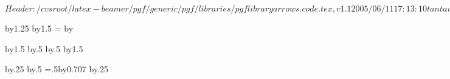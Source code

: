 \ProvidesPackageRCS $Header: /cvsroot/latex-beamer/pgf/generic/pgf/libraries/pgflibraryarrows.code.tex,v 1.1 2005/06/11 17:13:10 tantau Exp $

%



\pgfarrowsdeclare{[}{]}
{
  \@tempdima=1pt%
  \advance\@tempdima by1.25\pgflinewidth%
  \pgfarrowsleftextend{-\@tempdima}
  \pgfarrowsrightextend{.5\pgflinewidth}
}
{
  \@tempdima=2pt%
  \advance\@tempdima by1.5\pgflinewidth%
  \@tempdimb=\@tempdima%
  \advance\@tempdimb by\pgflinewidth%
  \pgfsetdash{}{0pt}
  \pgfsetmiterjoin
  \pgfsetbuttcap
  \pgfpathlineto{\pgfpoint{0pt}{-\@tempdima}}
  \pgfpathlineto{\pgfpoint{0pt}{\@tempdima}}
  \pgfusepathqstroke
}

\pgfarrowsdeclarereversed{]}{[}{[}{]}



\pgfarrowsdeclare{(}{)}
{
  \@tempdima=2pt%
  \advance\@tempdima by1.5\pgflinewidth%
  \@tempdima\advance\@tempdimb by.5\pgflinewidth%
  \pgfarrowsrightextend{\@tempdimb}
  \@tempdima\advance\@tempdimb by.5\pgflinewidth%
  \pgfarrowsleftextend{-\@tempdimb}
}
{
  \@tempdima=2pt%
  \advance\@tempdima by1.5\pgflinewidth%
  \pgfsetdash{}{0pt}
  \pgfsetroundcap
  \pgfpathcurveto
  {}
  {}
  {}
  \pgfusepathqstroke
}

\pgfarrowsdeclarereversed{)}{(}{(}{)}





{
  \@tempdima=0.3pt%
  \advance\@tempdima by.25\pgflinewidth%
  \@tempdima\advance\@tempdimb by.5\pgflinewidth%
  \pgfarrowsleftextend{-\@tempdimb}
  \@tempdimb=.5\@tempdima\advance\@tempdimb by0.707\pgflinewidth%
  \pgfarrowsrightextend{\@tempdimb}
}
{
  \@tempdima=0.3pt%
  \advance\@tempdima by.25\pgflinewidth%
  \pgfsetdash{}{0pt}
  \pgfsetroundcap
  \pgfsetmiterjoin
  \pgfusepathqstroke
}

